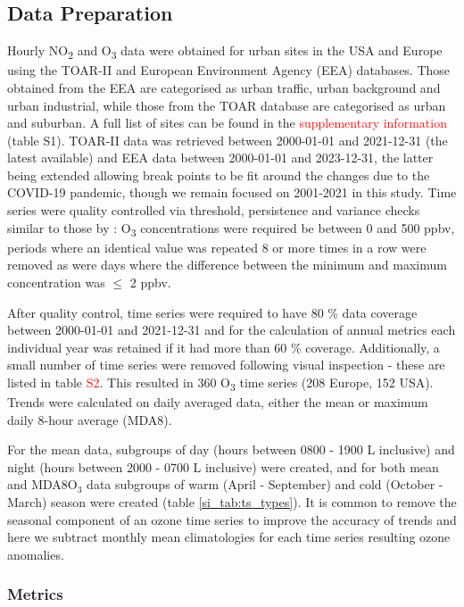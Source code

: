 \documentclass[journal abbreviation, manuscript]{copernicus}
\begin{document}
\subsection{Data Preparation} \label{sect:data_prep}
Hourly NO\textsubscript{2} and O\textsubscript{3} data were obtained for urban sites in the USA and Europe using the TOAR-II \citep{toar_db} and European Environment Agency (EEA) \citep{eea_1, eea_2} databases. Those obtained from the EEA are categorised as urban traffic, urban background and urban industrial, while those from the TOAR database are categorised as urban and suburban. A full list of sites can be found in the \textcolor{red}{supplementary information} (table S1).  TOAR-II data was retrieved between 2000-01-01 and 2021-12-31 (the latest available) and EEA data between 2000-01-01 and 2023-12-31, the latter being extended allowing break points to be fit around the changes due to the COVID-19 pandemic, though we remain focused on 2001-2021 in this study. Time series were quality controlled via threshold, persistence and variance checks similar to those by \cite{Wang2023}: O\textsubscript{3} concentrations were required be between 0 and 500 ppbv, periods where an identical value was repeated 8 or more times in a row were removed as were days where the difference between the minimum and maximum concentration was $\leq$ 2 ppbv. 

After quality control, time series were required to have 80 \% data coverage between 2000-01-01 and 2021-12-31 and for the calculation of annual metrics each individual year was retained if it had more than 60 \% coverage. Additionally, a small number of time series were removed following visual inspection - these are listed in table \textcolor{red}{S2}. This resulted in 360 O\textsubscript{3} time series (208 Europe, 152 USA). Trends were calculated on daily averaged data, either the mean or maximum daily 8-hour average (MDA8). 

For the mean data, subgroups of day (hours between 0800 - 1900 L inclusive) and night (hours between 2000 - 0700 L inclusive) were created, and for both mean and MDA8O$_3$ data subgroups of warm (April - September) and cold (October - March) season were created (table \ref{si_tab:ts_types}). It is common to remove the seasonal component of an ozone time series to improve the accuracy of trends \citep{cooper_2020} and here we subtract monthly mean climatologies for each time series resulting ozone anomalies. 

\subsubsection{Metrics}
\end{document}
